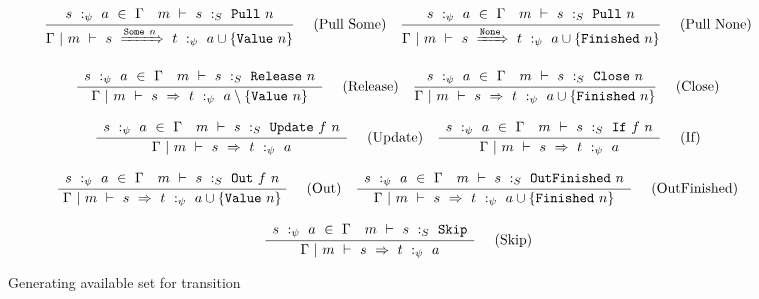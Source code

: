 
\begin{figure*}

$$
\frac {\displaystyle 
    \begin{array}{lr}
        s~:_\psi~ a ~\in~ \Gamma                    &
        m ~\vdash~ s ~:_S~ \mathtt{Pull}~n 
    \end{array}
} {\displaystyle  
    \Gamma ~|~ m ~\vdash~ s~\xRightarrow{ \mathtt{Some}~n }~t ~:_\psi~  a \cup \{ \mathtt{Value}~n \} 
} \ 
\quad
\textrm{(Pull Some)}
\quad
\frac {\displaystyle 
    \begin{array}{lr}
        s~:_\psi~ a ~\in~ \Gamma                    &
        m ~\vdash~ s ~:_S~ \mathtt{Pull}~n
    \end{array}
} {\displaystyle  
    \Gamma ~|~ m ~\vdash~ s~\xRightarrow{ \mathtt{None}}~t ~:_\psi~  a \cup \{ \mathtt{Finished}~n \} 
} \ 
\quad
\textrm{(Pull None)}
$$

$$
\frac {\displaystyle 
    \begin{array}{lr}
        s~:_\psi~ a ~\in~ \Gamma                        &
        m ~\vdash~ s ~:_S~ \mathtt{Release}~n
    \end{array}
} {\displaystyle  
    \Gamma ~|~ m ~\vdash~ s~\Rightarrow~t ~:_\psi~  a \setminus \{ \mathtt{Value}~n \} 
} \ 
\quad
\textrm{(Release)}
\quad
\frac {\displaystyle 
    \begin{array}{lr}
        s~:_\psi~ a ~\in~ \Gamma                    &
        m ~\vdash~ s ~:_S~ \mathtt{Close}~n
    \end{array}
} {\displaystyle  
    \Gamma ~|~ m ~\vdash~ s~\Rightarrow~t ~:_\psi~  a \cup \{ \mathtt{Finished}~n \} 
} \ 
\quad
\textrm{(Close)}
$$

$$
\frac {\displaystyle 
    \begin{array}{lr}
        s~:_\psi~ a ~\in~ \Gamma                        &
        m ~\vdash~ s ~:_S~ \mathtt{Update}~f~n
    \end{array}
} {\displaystyle  
    \Gamma ~|~ m ~\vdash~ s~\Rightarrow~t ~:_\psi~  a 
} \ 
\quad
\textrm{(Update)}
\quad
\frac {\displaystyle 
    \begin{array}{lr}
        s~:_\psi~ a ~\in~ \Gamma                    &
        m ~\vdash~ s ~:_S~ \mathtt{If}~f~n
    \end{array}
} {\displaystyle  
    \Gamma ~|~ m ~\vdash~ s~\Rightarrow~t ~:_\psi~  a 
} \ 
\quad
\textrm{(If)}
$$

$$
\frac {\displaystyle 
    \begin{array}{lr}
        s~:_\psi~ a ~\in~ \Gamma                      &
        m ~\vdash~ s ~:_S~ \mathtt{Out}~f~n
    \end{array}
} {\displaystyle  
    \Gamma ~|~ m ~\vdash~ s~\Rightarrow~t ~:_\psi~  a \cup \{ \mathtt{Value}~n \} 
} \ 
\quad
\textrm{(Out)}
\quad
\frac {\displaystyle 
    \begin{array}{lr}
        s~:_\psi~ a ~\in~ \Gamma                           &
        m ~\vdash~ s ~:_S~ \mathtt{OutFinished}~n
    \end{array}
} {\displaystyle  
    \Gamma ~|~ m ~\vdash~ s~\Rightarrow~t ~:_\psi~  a \cup \{ \mathtt{Finished}~n \} 
} \ 
\quad
\textrm{(OutFinished)}
$$

$$
\frac {\displaystyle 
    \begin{array}{lr}
        s~:_\psi~ a ~\in~ \Gamma                 &
        m ~\vdash~ s ~:_S~ \mathtt{Skip}
    \end{array}
} {\displaystyle  
    \Gamma ~|~ m ~\vdash~ s~\Rightarrow~t ~:_\psi~  a 
} \ 
\quad
\textrm{(Skip)}
$$


\caption{Generating available set for transition}
\label{fig:inv:generation}
\end{figure*}

